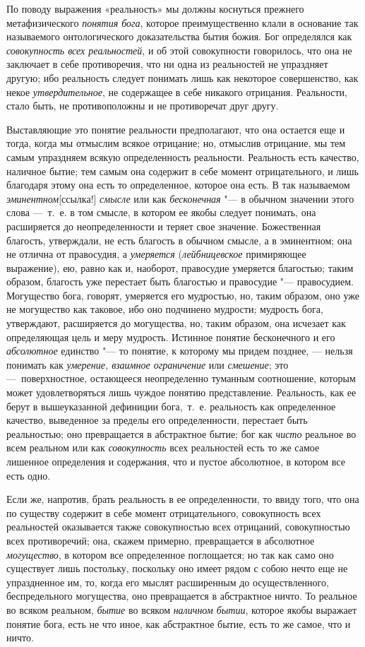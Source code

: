 По поводу выражения «реальность» мы должны коснуться прежнего
метафизического {\em понятия бога}, которое
преимущественно клали в основание так называемого онтологического
доказательства бытия божия. Бог определялся как
{\em совокупность всех реальностей}, и об этой
совокупности говорилось, что она не заключает в себе противоречия, что ни
одна из реальностей не упраздняет другую; ибо реальность следует понимать
лишь как некоторое совершенство, как некое
{\em утвердительное}, не содержащее в себе никакого
отрицания. Реальности, стало быть, не противоположны и не противоречат друг
другу.

Выставляющие это понятие реальности предполагают, что она остается еще и
тогда, когда мы отмыслим всякое отрицание; но, отмыслив отрицание, мы тем
самым упраздняем всякую определенность реальности. Реальность есть
качество, наличное бытие; тем самым она содержит в себе момент
отрицательного, и лишь благодаря этому она есть то определенное, которое
она есть. В так называемом
{\em эминентном}[ссылка!]
{\em смысле} или как
{\em бесконечная} "--- в обычном значении этого слова
—~т.~е. в том смысле, в котором ее якобы следует понимать, она расширяется
до неопределенности и теряет свое значение. Божественная благость,
утверждали, не есть благость в обычном смысле, а в эминентном; она не
отлична от правосудия, а {\em умеряется}
({\em лейбницевское} примиряющее выражение), ею, равно
как и, наоборот, правосудие умеряется благостью; таким образом, благость
уже перестает быть благостью и правосудие "--- правосудием. Могущество бога,
говорят, умеряется его мудростью, но, таким образом, оно уже не могущество
как таковое, ибо оно подчинено мудрости; мудрость бога, утверждают,
расширяется до могущества, но, таким образом, она исчезает как определяющая
цель и меру мудрость. Истинное понятие бесконечного и его
{\em абсолютное} единство "--- то понятие, к которому мы
придем позднее, — нельзя понимать как {\em умерение,
взаимное ограничение} или {\em смешение}; это
—~поверхностное, остающееся неопределенно туманным соотношение, которым
может удовлетворяться лишь чуждое понятию представление. Реальность, как ее
берут в вышеуказанной дефиниции бога,~т.~е. реальность как определенное
качество, выведенное за пределы его определенности, перестает быть
реальностью; оно превращается в абстрактное бытие; бог как
{\em чисто} реальное во всем реальном или как
{\em совокупность} всех реальностей есть то же самое
лишенное определения и содержания, что и пустое абсолютное, в котором все
есть одно.

Если же, напротив, брать реальность в ее определенности, то ввиду того, что
она по существу содержит в себе момент отрицательного, совокупность всех
реальностей оказывается также совокупностью всех отрицаний, совокупностью
всех противоречий; она, скажем примерно, превращается в абсолютное
{\em могущество}, в котором все определенное
поглощается; но так как само оно существует лишь постольку, поскольку оно
имеет рядом с собою нечто еще не упраздненное им, то, когда его мыслят
расширенным до осуществленного, беспредельного могущества, оно превращается
в абстрактное ничто. То реальное во всяком реальном,
{\em бытие} во всяком {\em наличном
бытии}, которое якобы выражает понятие бога, есть не что иное, как
абстрактное бытие, есть то же самое, что и ничто.

